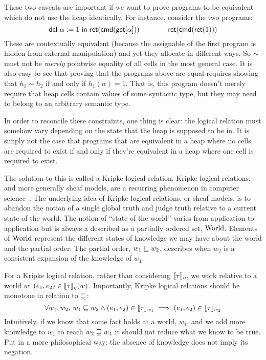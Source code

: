 These two caveats are important if we want to prove programs to be
equivalent which do not use the heap identically. For instance,
consider the two programs:
\[
  \mathsf{dcl}\ \alpha := 1\ \mathsf{in}\ \mathsf{ret}(\mathsf{cmd}(\mathsf{get}[\alpha])) \qquad\qquad
  \mathsf{ret}(\mathsf{cmd}(\mathsf{ret}(1)))
\]
These are contextually equivalent (because the assignable of the first
program is hidden from external manipulation) and yet they allocate in
different ways. So $\sim$ must not be \emph{merely} pointwise equality
of all cells in the most general case. It is also easy to see that
proving that the programs above are equal requires showing that
$h_1 \sim h_2$ if and only if $h_1(\alpha) = 1$. That is, this program
doesn't merely require that heap cells contain values of some
syntactic type, but they may need to belong to an arbitrary semantic
type.

In order to reconcile these constraints, one thing is clear: the
logical relation must somehow vary depending on the state that the
heap is supposed to be in. It is simply not the case that programs
that are equivalent in a heap where no cells are required to exist if
and only if they're equivalent in a heap where one cell is required to
exist.

The solution to this is called a Kripke logical relation. Kripke
logical relations, and more generally sheaf models, are a recurring
phenomenon in computer
science~\citep{Plotkin:80,Mitchell:91,Appel:01,Ahmed:04}. The
underlying idea of Kripke logical relations, or sheaf models, is to
abandon the notion of a single global truth and judge truth relative
to a current state of the world. The notion of ``state of the world''
varies from application to application but is always a described as a
partially ordered set, $\mathrm{World}$. Elements of $\mathrm{World}$ represent the
different states of knowledge we may have about the world and the
partial order. The partial order, $w_1 \mathrel{\sqsubseteq} w_2$, describes when
$w_2$ is a consistent expansion of the knowledge of $w_1$.

For a Kripke logical relation, rather than considering
$\llbracket \tau \rrbracket_\eta$, we work relative to a world $w$:
$(e_1, e_2) \in \llbracket \tau \rrbracket_\eta(w)$. Importantly, Kripke logical relations
should be monotone in relation to $\mathrel{\sqsubseteq}$:
\[
  \forall w_1, w_2.
  \ w_1 \mathrel{\sqsubseteq} w_2 \land (e_1, e_2) \in \llbracket \tau \rrbracket_{w_1}
  \implies (e_1, e_2) \in \llbracket \tau \rrbracket_{w_2}
\]
Intuitively, if we know that some fact holds at a world, $w_1$, and we
add more knowledge to $w_1$ to reach $w_2 \mathrel{\sqsupseteq} w_1$ it should not
reduce what we know to be true. Put in a more philosophical way: the
absence of knowledge does not imply its negation.


